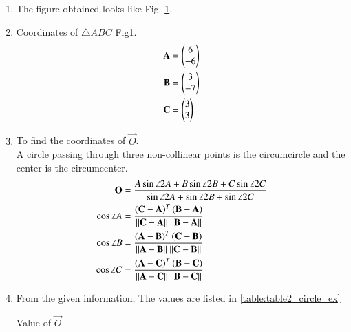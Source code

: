 \renewcommand{\theequation}{\theenumi}
\begin{enumerate}[label=\thesubsection.\arabic*.,ref=\thesubsection.\theenumi]

\begin{figure}[!ht]
\centering
\resizebox{\columnwidth}{!}{}
\caption{Circumcircle by Latex-Tikz}
\label{fig:Circumcircle_circle_ex}	
\end{figure}

\item The figure obtained looks like Fig. \ref{fig:Circumcircle_circle_ex}.\\ 

\item Coordinates of $\triangle ABC$ Fig\ref{fig:Circumcircle_circle_ex}. \\
\begin{align}
\mathbf{A} &=\begin{pmatrix}6\\-6\end{pmatrix} \label{eq:constr_a_circle_ex}\\
\mathbf{B} &=\begin{pmatrix}3\\-7\end{pmatrix} \label{eq:constr_b_circle_ex}\\
\mathbf{C} &=\begin{pmatrix}3\\3\end{pmatrix} \label{eq:constr_c_circle_ex}
\end{align}

\item To find the coordinates of $\vec{O}$. \\
\solution A circle passing through three non-collinear points is the circumcircle and the center is the circumcenter.\\
\begin{align}
\mathbf{O} &= \frac{A\sin{\angle 2A} + B\sin{\angle 2B} + C\sin{\angle 2C}}{\sin{\angle 2A} + \sin{\angle 2B} + \sin{\angle 2C}}\\
\cos{\angle A} &= \frac{ \left(\mathbf{C}-\mathbf{A}\right)^T \left(\mathbf{B}-\mathbf{A}\right)}{\| \mathbf{C}-\mathbf{A} \|\ \| \mathbf{B}-\mathbf{A} \|} \\
\cos{\angle B} &= \frac{ \left(\mathbf{A}-\mathbf{B}\right)^T \left(\mathbf{C}-\mathbf{B}\right)}{\| \mathbf{A}-\mathbf{B} \|\ \| \mathbf{C}-\mathbf{B} \|} \\
\cos{\angle C} &= \frac{ \left(\mathbf{A}-\mathbf{C}\right)^T \left(\mathbf{B}-\mathbf{C}\right)}{\| \mathbf{A}-\mathbf{C} \|\ \| \mathbf{B}-\mathbf{C} \|} 
\end{align}

\item
From the given information, 
The values are listed in \ref{table:table2_circle_ex}\\
\begin{table}[ht!]
\centering

\caption{Value of $\vec{O}$}
\label{table:table2_circle_ex}	
\end{table} 


\end{enumerate}
